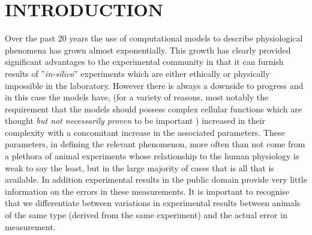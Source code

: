 \section{INTRODUCTION}
Over the past 20 years the use of computational models to describe physiological phenomena has grown almost exponentially. This growth has clearly provided significant advantages to the experimental community in that it can furnish results of ''\textit{in-silico}'' experiments which are either ethically or physically impossible in the laboratory. However there is always a downside to progress and in this case the models have, (for a variety of reasons, most notably the requirement that the models should possess complex cellular functions which are thought \textit{but not necessarily proven} to be important ) increased in their complexity with a concomitant increase in the associated parameters. These parameters, in defining the relevant phenomenon, more often than not come from a plethora of animal experiments whose relationship to the human physiology is weak to say the least, but in the large majority of cases that is all that is available.  In addition experimental results in the public domain provide very little information on the errors in these measurements. It is important to recognise that we differentiate between variations in experimental results between animals of the same type (derived from the same experiment) and the actual error in measurement. \\

